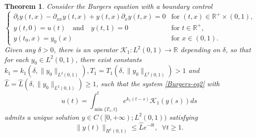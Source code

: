 \documentclass[review]{elsarticle}
\newtheorem{theorem}{Theorem}[section]
\numberwithin{equation}{section}
\begin{document}
\begin{theorem}
\label{global-exp-sta-burgers}
    Consider the Burgers equation with a boundary control
    \begin{equation}
    \label{Burgers-eq2}
\left\{\begin{array}{ll}
\partial_t y(t,x)- \partial_{xx}y(t,x)+y (t,x) \partial_x y(t,x)=0 & \text{for }(t,x)\in \mathbb{R}^+\times (0,1),\\[2mm]
y( t,0)=u(t)\quad\text{and}\quad y( t,1)=0& \text{for }t\in \mathbb{R}^+,\\[2mm]
y(t_0,x)=y_0(x)& \text{for }x\in (0,1).
\end{array}\right.
\end{equation}
Given any $\delta>0$, there is an operator $\mathcal{K}_1:L^2(0,1)\to \mathbb{R}$ depending on $\delta$, so that for each $y_0\in L^2(0,1)$, there exist constants ${k}_1=k_1\left(\delta,\|y_0\|_{L^2(0,1)}\right),{T}_1=T_1\left(\delta,\|y_0\|_{L^2(0,1)}\right)>1$ and $\hat{L}=\hat{L}\left(\delta,\|y_0\|_{L^2(0,1)}\right)\ge 1$, such that the system \eqref{Burgers-eq2} with 
\begin{equation}
    \label{u}
    {u}(t)=\int_{\min\{{T}_1,t\}}^t e^{k_1(t-s)}{\mathcal{K}}_1(y(s))ds
\end{equation}
admits a unique solution $y\in C([0,+\infty);L^2(0,1))$ satisfying
\begin{equation}
    \label{global-burgers}
    \|y(t)\|_{H^1(0,1)}\le\hat{L}e^{-\delta t},\;\;\forall t\ge 1.
\end{equation}
\end{theorem}
\end{document}
